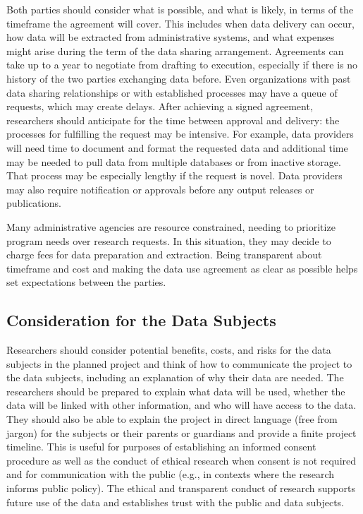 \documentclass[
]{book}
\begin{document}
Both parties should consider what is possible, and what is likely, in terms of the timeframe the agreement will cover. This includes when data delivery can occur, how data will be extracted from administrative systems, and what expenses might arise during the term of the data sharing arrangement. Agreements can take up to a year to negotiate from drafting to execution, especially if there is no history of the two parties exchanging data before. Even organizations with past data sharing relationships or with established processes may have a queue of requests, which may create delays. After achieving a signed agreement, researchers should anticipate for the time between approval and delivery: the processes for fulfilling the request may be intensive. For example, data providers will need time to document and format the requested data and additional time may be needed to pull data from multiple databases or from inactive storage. That process may be especially lengthy if the request is novel. Data providers may also require notification or approvals before any output releases or publications.

Many administrative agencies are resource constrained, needing to prioritize program needs over research requests. In this situation, they may decide to charge fees for data preparation and extraction. Being transparent about timeframe and cost and making the data use agreement as clear as possible helps set expectations between the parties.

\hypertarget{consideration-for-the-data-subjects}{%
\subsection{Consideration for the Data Subjects}\label{consideration-for-the-data-subjects}}

Researchers should consider potential benefits, costs, and risks for the data subjects in the planned project and think of how to communicate the project to the data subjects, including an explanation of why their data are needed. The researchers should be prepared to explain what data will be used, whether the data will be linked with other information, and who will have access to the data. They should also be able to explain the project in direct language (free from jargon) for the subjects or their parents or guardians and provide a finite project timeline. This is useful for purposes of establishing an informed consent procedure as well as the conduct of ethical research when consent is not required and for communication with the public (e.g., in contexts where the research informs public policy). The ethical and transparent conduct of research supports future use of the data and establishes trust with the public and data subjects.
\end{document}
